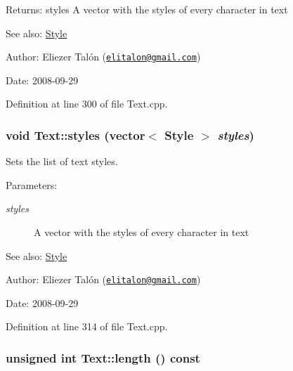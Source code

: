 \begin{Desc}
\item[Returns:]styles A vector with the styles of every character in text\end{Desc}
\begin{Desc}
\item[See also:]\hyperlink{class_style}{Style}\end{Desc}
\begin{Desc}
\item[Author:]Eliezer Talón (\href{mailto:elitalon@gmail.com}{\tt elitalon@gmail.com}) \end{Desc}
\begin{Desc}
\item[Date:]2008-09-29 \end{Desc}


Definition at line 300 of file Text.cpp.\hypertarget{class_text_5782b92326b7e3c851c38f82cb412b70}{
\subsubsection[styles]{\setlength{\rightskip}{0pt plus 5cm}void Text::styles (vector$<$ {\bf Style} $>$ {\em styles})}}
\label{class_text_5782b92326b7e3c851c38f82cb412b70}


Sets the list of text styles. 

\begin{Desc}
\item[Parameters:]
\begin{description}
\item[{\em styles}]A vector with the styles of every character in text\end{description}
\end{Desc}
\begin{Desc}
\item[See also:]\hyperlink{class_style}{Style}\end{Desc}
\begin{Desc}
\item[Author:]Eliezer Talón (\href{mailto:elitalon@gmail.com}{\tt elitalon@gmail.com}) \end{Desc}
\begin{Desc}
\item[Date:]2008-09-29 \end{Desc}


Definition at line 314 of file Text.cpp.\hypertarget{class_text_8d76db538f8617fb8880ba3e4ff3e6a5}{
\subsubsection[length]{\setlength{\rightskip}{0pt plus 5cm}unsigned int Text::length () const}}
\label{class_text_8d76db538f8617fb8880ba3e4ff3e6a5}


